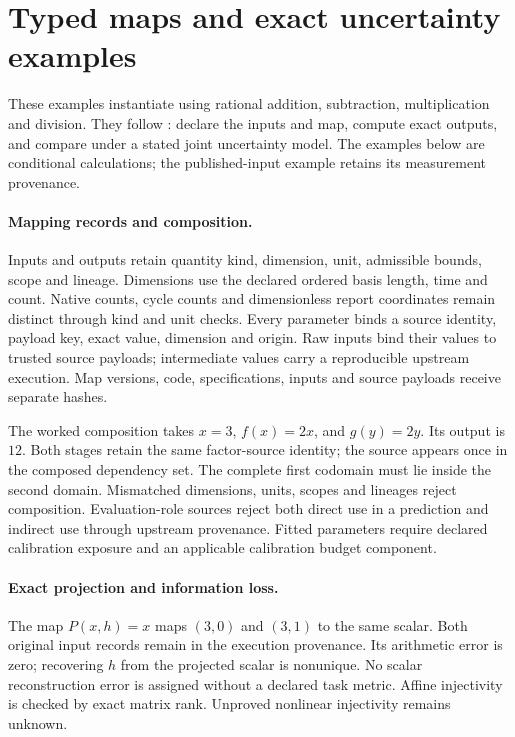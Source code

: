 \section{Typed maps and exact uncertainty examples}
\label{manual:m3-mapping-error}
These examples instantiate  using rational
addition, subtraction, multiplication and division.
They follow : declare the inputs and map,
compute exact outputs, and compare under a stated joint uncertainty model.
The examples below are conditional calculations; the published-input example
retains its measurement provenance.

\paragraph{Mapping records and composition.}
Inputs and outputs retain quantity kind, dimension, unit, admissible bounds, scope and
lineage. Dimensions use the declared ordered basis length, time and count.
Native counts, cycle counts and dimensionless report coordinates remain distinct
through kind and unit checks. Every parameter binds a source identity, payload
key, exact value, dimension and origin. Raw inputs bind their values to trusted
source payloads; intermediate values carry a reproducible upstream execution.
Map versions, code, specifications, inputs and source payloads receive separate
hashes.

The worked composition takes \(x=3\), \(f(x)=2x\), and \(g(y)=2y\).
Its output is \(12\). Both stages retain the same factor-source identity;
the source appears once in the composed dependency set. The complete first
codomain must lie inside the second domain. Mismatched dimensions, units,
scopes and lineages reject composition. Evaluation-role sources reject both
direct use in a prediction and indirect use through upstream provenance.
Fitted parameters require declared calibration exposure and an applicable
calibration budget component.

\paragraph{Exact projection and information loss.}
The map \(P(x,h)=x\) maps \((3,0)\) and \((3,1)\) to the same scalar.
Both original input records remain in the execution provenance. Its arithmetic
error is zero; recovering \(h\) from the projected scalar is nonunique.
No scalar reconstruction error is assigned without a declared task metric.
Affine injectivity is checked by exact matrix rank.
Unproved nonlinear injectivity remains unknown.

